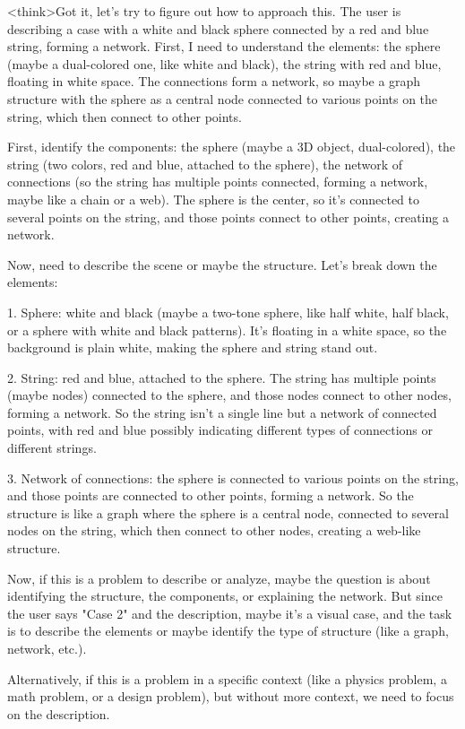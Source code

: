<think>Got it, let's try to figure out how to approach this. The user is describing a case with a white and black sphere connected by a red and blue string, forming a network. First, I need to understand the elements: the sphere (maybe a dual-colored one, like white and black), the string with red and blue, floating in white space. The connections form a network, so maybe a graph structure with the sphere as a central node connected to various points on the string, which then connect to other points.

First, identify the components: the sphere (maybe a 3D object, dual-colored), the string (two colors, red and blue, attached to the sphere), the network of connections (so the string has multiple points connected, forming a network, maybe like a chain or a web). The sphere is the center, so it's connected to several points on the string, and those points connect to other points, creating a network.

Now, need to describe the scene or maybe the structure. Let's break down the elements:

1. Sphere: white and black (maybe a two-tone sphere, like half white, half black, or a sphere with white and black patterns). It's floating in a white space, so the background is plain white, making the sphere and string stand out.

2. String: red and blue, attached to the sphere. The string has multiple points (maybe nodes) connected to the sphere, and those nodes connect to other nodes, forming a network. So the string isn't a single line but a network of connected points, with red and blue possibly indicating different types of connections or different strings.

3. Network of connections: the sphere is connected to various points on the string, and those points are connected to other points, forming a network. So the structure is like a graph where the sphere is a central node, connected to several nodes on the string, which then connect to other nodes, creating a web-like structure.

Now, if this is a problem to describe or analyze, maybe the question is about identifying the structure, the components, or explaining the network. But since the user says "Case 2" and the description, maybe it's a visual case, and the task is to describe the elements or maybe identify the type of structure (like a graph, network, etc.).

Alternatively, if this is a problem in a specific context (like a physics problem, a math problem, or a design problem), but without more context, we need to focus on the description.

